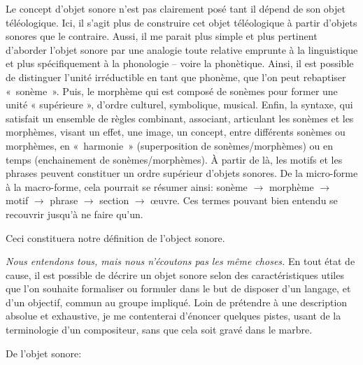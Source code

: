 \documentclass{article}
\begin{document}
Le concept d'objet sonore n'est pas clairement posé tant il dépend de son objet téléologique. Ici, il s'agit plus de construire cet objet téléologique à partir d'objets sonores que le contraire.   
Aussi, il me parait plus simple et plus pertinent d'aborder l'objet sonore par une analogie toute relative emprunte à la linguistique et plus spécifiquement à la phonologie -- voire la phonètique. Ainsi, il est possible de distinguer l'unité irréductible en tant que phonème, que l'on peut rebaptiser \hbox{« sonème »}. Puis, le morphème qui est composé de sonèmes pour former une unité « supérieure », d'ordre culturel, symbolique, musical. Enfin, la syntaxe, qui satisfait un ensemble de règles combinant, associant, articulant les sonèmes et les morphèmes, visant un effet, une image, un concept, entre différents sonèmes ou morphèmes, en \hbox{« harmonie »} (superposition de sonèmes/morphèmes) ou en temps (enchainement de sonèmes/morphèmes). À partir de là, les motifs et les phrases peuvent constituer un ordre supérieur d'objets sonores. De la micro-forme à la macro-forme, cela pourrait se résumer ainsi:
sonème $\rightarrow$ morphème $\rightarrow$ motif $\rightarrow$ phrase $\rightarrow$ section $\rightarrow$ œuvre. Ces termes pouvant bien entendu se recouvrir jusqu'à ne faire qu'un.

Ceci constituera notre définition de l'object sonore.
\bigskip

\textit
{Nous entendons tous, mais nous n'écoutons pas les même choses.}
En tout état de cause, il est possible de décrire un objet sonore selon des caractéristiques utiles que l'on souhaite formaliser ou formuler dans le but de disposer d'un langage, et d'un objectif, commun au groupe impliqué. Loin de prétendre à une description absolue et exhaustive, je me contenterai d'énoncer quelques pistes, usant de la terminologie d'un compositeur, sans que cela soit gravé dans le marbre. 
\bigskip

De l'objet sonore:
\end{document}
